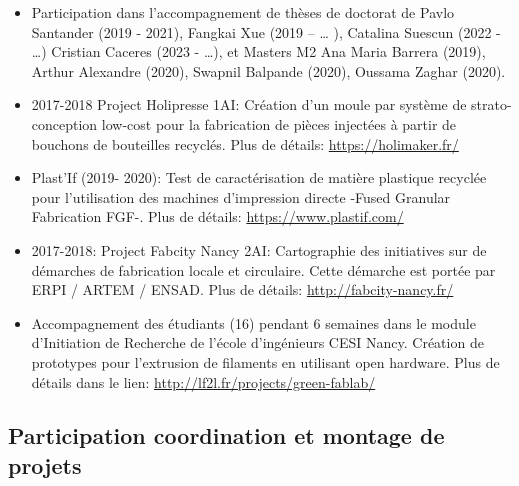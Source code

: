 \documentclass[
  11pt,
]{article}
\begin{document}
\begin{itemize}
\item
  Participation dans l'accompagnement de thèses de doctorat de Pavlo
  Santander (2019 - 2021), Fangkai Xue (2019 -- \ldots{} ), Catalina
  Suescun (2022 - \ldots) Cristian Caceres (2023 - \ldots), et Masters
  M2 Ana Maria Barrera (2019), Arthur Alexandre (2020), Swapnil Balpande
  (2020), Oussama Zaghar (2020).
\item
  2017-2018 Project Holipresse 1AI: Création d'un moule par système de
  strato-conception low-cost pour la fabrication de pièces injectées à
  partir de bouchons de bouteilles recyclés. Plus de détails:
  \url{https://holimaker.fr/}
\item
  Plast'If (2019- 2020): Test de caractérisation de matière plastique
  recyclée pour l'utilisation des machines d'impression directe -Fused
  Granular Fabrication FGF-. Plus de détails:
  \url{https://www.plastif.com/}
\item
  2017-2018: Project Fabcity Nancy 2AI: Cartographie des initiatives sur
  de démarches de fabrication locale et circulaire. Cette démarche est
  portée par ERPI / ARTEM / ENSAD. Plus de détails:
  \url{http://fabcity-nancy.fr/}
\item
  Accompagnement des étudiants (16) pendant 6 semaines dans le module
  d'Initiation de Recherche de l'école d'ingénieurs CESI Nancy. Création
  de prototypes pour l'extrusion de filaments en utilisant open
  hardware. Plus de détails dans le lien:
  \url{http://lf2l.fr/projects/green-fablab/}
\end{itemize}

\hypertarget{participation-coordination-et-montage-de-projets}{%
\subsection{Participation coordination et montage de
projets}\label{participation-coordination-et-montage-de-projets}}
\end{document}
